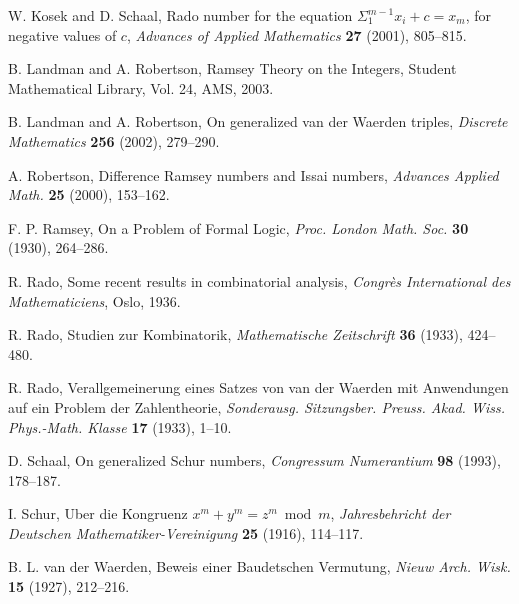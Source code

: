 \documentclass[12pt]{report}
\begin{document}
\begin{thebibliography}{99}
W. Kosek and D. Schaal, Rado number for the equation $\Sigma_1^{m-1} x_i + c=x_m$, for negative values of $c$, {\it Advances of Applied Mathematics\/} {\bf 27} (2001), 805--815.

B. Landman and A. Robertson, Ramsey Theory on the Integers, Student Mathematical Library, Vol. 24, AMS, 2003. 

B. Landman and A. Robertson, On generalized van der Waerden triples, {\it Discrete Mathematics\/} {\bf  256} (2002), 279--290.

A. Robertson, Difference Ramsey numbers and Issai numbers, {\it Advances Applied Math.\/} {\bf 25} (2000), 153--162.

F. P. Ramsey, On a Problem of Formal Logic, {\it Proc. London Math. Soc.\/} {\bf 30} (1930), 264--286.

R. Rado, Some recent results in combinatorial analysis, {\it Congr\`{e}s International des Mathematiciens\/}, Oslo, 1936.

R. Rado, Studien zur Kombinatorik, {\it Mathematische Zeitschrift\/} {\bf 36} (1933), 424--480.

R. Rado, Verallgemeinerung eines Satzes von van der Waerden mit Anwendungen auf ein Problem der Zahlentheorie, {\it Sonderausg. Sitzungsber. Preuss. Akad. Wiss. Phys.-Math. Klasse\/} {\bf 17} (1933), 1--10.

D. Schaal, On generalized Schur numbers, {\it Congressum Numerantium\/} {\bf 98} (1993), 178--187.

I. Schur, Uber die Kongruenz $x^m+y^m=z^m \bmod{m}$, {\it Jahresbehricht der Deutschen Mathematiker-Vereinigung\/} {\bf 25} (1916), 114--117.  

B. L. van der Waerden, Beweis einer Baudetschen Vermutung, {\it Nieuw Arch. Wisk. \/} {\bf 15} (1927), 212--216.

\end{thebibliography}
\end{document}
